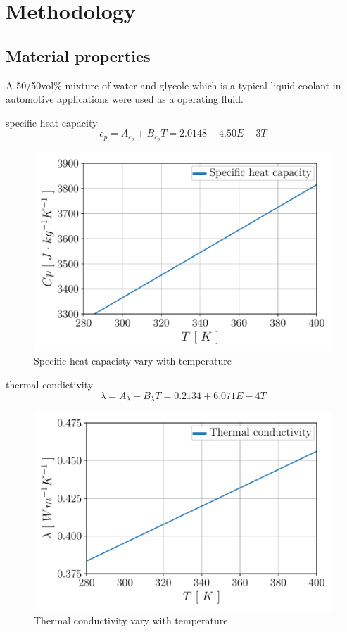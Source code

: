 \documentclass[12pt,oneside]{jbook}
\begin{document}
\chapter{Methodology}
\section{Material properties}
A 50/50vol\% mixture of water and glycole which is a typical liquid coolant in automotive applications were used as a operating fluid.

specific heat capacity
\begin{equation}
	c_{p} = A_{c_{p}}+B_{c_{p}} T = 2.0148 + 4.50E-3T
	\label{Cp}
\end{equation}
\begin{figure}[ht]
	\vspace{0zh}
	\begin{center}
		\includegraphics[width=0.65\linewidth]{fig/cp.pdf}
		\vspace{-1zh}
		\caption{Specific heat capacisty vary with temperature}
		\label{cp}
	\end{center}
	\vspace{0zh}
\end{figure}


thermal condictivity
\begin{equation}
	\lambda = A_{\lambda}+B_{\lambda} T = 0.2134 + 6.071E-4T
	\label{lambda}
\end{equation}
\begin{figure}[ht]
	\vspace{0zh}
	\begin{center}
		\includegraphics[width=0.65\linewidth]{fig/lambda.pdf}
		\vspace{-1zh}
		\caption{Thermal conductivity vary with temperature}
		\label{lambda}
	\end{center}
	\vspace{0zh}
\end{figure}
\end{document}
